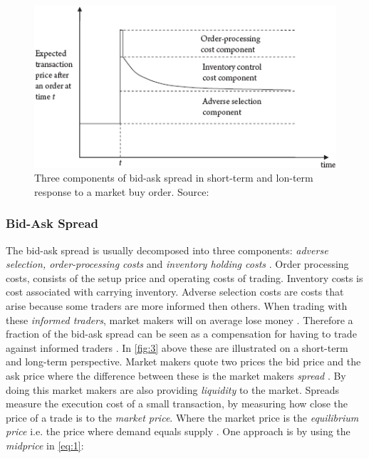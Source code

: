 \documentclass{kththesis}
\theoremstyle{definition}
\begin{document}
\begin{figure}[H]
    \centering
    \includegraphics[scale=1]{bidask.png}
    \caption{Three components of bid-ask spread in short-term and lon-term response to a market buy order. Source: \textcite{foucault2013market}}
    \label{fig:3}
\end{figure}


\subsubsection*{Bid-Ask Spread}

The bid-ask spread is usually decomposed into three components: \textit{adverse selection, order-processing costs} and \textit{inventory holding costs} \parencite{foucault2013market}. Order processing costs, consists of the setup price and operating costs of trading. Inventory costs is cost associated with carrying inventory. Adverse selection costs are costs that arise because some traders are more informed then others. When trading with these \textit{informed traders}, market makers will on average lose money \parencite{darley2007nasdaq}. Therefore a fraction of the bid-ask spread can be seen as a compensation for having to trade against informed traders \parencite{darley2007nasdaq}. In \autoref{fig:3} above these are illustrated on a short-term and long-term perspective.
\newline
\newline
Market makers quote two prices the bid price and the ask price where the difference between these is the market makers \textit{spread} \parencite{madhavan2000market}. By doing this market makers are also providing \textit{liquidity} to the market. Spreads measure the execution cost of a small transaction, by measuring how close the price of a trade is to the \textit{market price}. Where the market price is the \textit{equilibrium price} i.e. the price where demand equals supply \parencite{cartea2015algorithmic}. One approach is by using the \textit{midprice} in \autoref{eq:1}:
\end{document}
